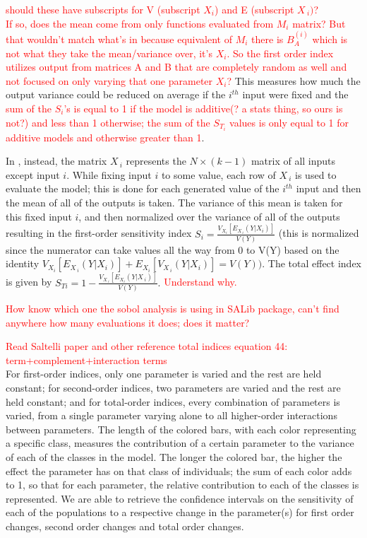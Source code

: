 \documentclass[12pt]{article}
\begin{document}
\textcolor{red}{should these have subscripts for V (subscript $X_i$) and E (subscript $X_{~i})$?  \\
If so, does the mean come from only functions evaluated from $M_i$ matrix? But that wouldn't match what's in} \cite{Saltelli2} \textcolor{red}{because equivalent of $M_i$ there is $B_A^{(i)}$ which is not what they take the mean/variance over, it's $X_i$.} \textcolor{red}{So the first order index utilizes output from matrices A and B that are completely random as well and not focused on only varying that one parameter $X_i$?} This measures how much the output variance could be reduced on average if the $i^{th}$ input were fixed and the \textcolor{red}{sum of the $S_i$'s is equal to 1 if the model is additive(? a stats thing, so ours is not?) and less than 1 otherwise; the sum of the $S_{T_i}$ values is only equal to 1 for additive models and otherwise greater than 1}. 

In \cite{Saltelli2}, instead, the matrix $X_{~i}$ represents the $N \times (k-1)$ matrix of all inputs except input $i.$ While fixing input $i$ to some value, each row of $X_{~i}$ is used to evaluate the model; this is done for each generated value of the $i^{th}$ input and then the mean of all of the outputs is taken. The variance of this mean is taken for this fixed input $i$, and then normalized over the variance of all of the outputs resulting in the first-order sensitivity index $S_i=\frac{V_{X_i}[E_{X_{~i}}(Y|X_i)]}{V(Y)}$ (this is normalized since the numerator can take values all the way from 0 to V(Y) based on the identity $V_{X_i}[E_{X_{~i}}(Y|X_i)]+E_{X_i}[V_{X_{~i}}(Y|X_i)]=V(Y))$. The total effect index is given by $S_{Ti}=1-\frac{V_{X_{~i}}[E_{X_i}(Y|X_{~i})]}{V(Y)}.$ \textcolor{red}{Understand why.}

\textcolor{red}{How know which one the sobol analysis is using in SALib package, can't find anywhere how many evaluations it does; does it matter?}


\textcolor{red}{Read Saltelli paper and other reference total indices equation 44: term+complement+interaction terms} \\

For first-order indices, only one parameter is varied and the rest are held constant; for second-order indices, two parameters are varied and the rest are held constant; and for total-order indices, every combination of parameters is varied, from a single parameter varying alone to all higher-order interactions between parameters. The length of the colored bars, with each color representing a specific class, measures the contribution of a certain parameter to the variance of each of the classes in the model. The longer the colored bar, the higher the effect the parameter has on that class of individuals; the sum of each color adds to 1, so that for each parameter, the relative contribution to each of the classes is represented. We are able to retrieve the confidence intervals on the sensitivity of each of the populations to a respective change in the parameter(s) for first order changes, second order changes and total order changes. \\
\end{document}
